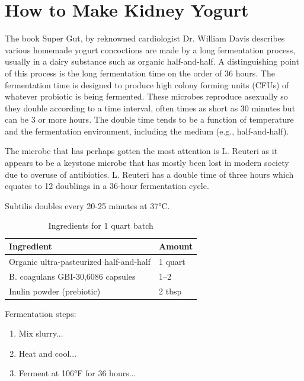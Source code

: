 \section{How to Make Kidney Yogurt}


The book Super Gut, by reknowned cardiologist Dr. William Davis describes various homemade yogurt concoctions are made by a long fermentation process, usually in a dairy substance such as organic half-and-half. A distinguishing point of this process is the long fermentation time on the order of 36 hours. The fermentation time is designed to produce high colony forming units (CFUs) of whatever probiotic is being fermented. These microbes reproduce asexually so they double according to a time interval, often times as short as 30 minutes but can be 3 or more hours. The double time tends to be a function of temperature and the fermentation environment, including the medium (e.g., half-and-half).

The microbe that has perhaps gotten the most attention is L. Reuteri as it appears to be a keystone microbe that has mostly been lost in modern society due to overuse of antibiotics. L. Reuteri has a double time of three hours which equates to 12 doublings in a 36-hour fermentation cycle.

Subtilis doubles every 20-25 minutes at 37°C. 

\begin{table}[ht]
	\centering
	\begin{tabular}{ll}
		\toprule
		\textbf{Ingredient} & \textbf{Amount} \\
		\midrule
		Organic ultra-pasteurized half-and-half & 1 quart \\
		B. coagulans GBI-30,6086 capsules & 1--2 \\
		Inulin powder (prebiotic) & 2 tbsp \\
		\bottomrule
	\end{tabular}
	\caption{Ingredients for 1 quart batch}
	\label{tab:recipe-ingredients}
\end{table}

Fermentation steps:
\begin{enumerate}[leftmargin=*]
	\item Mix slurry...
	\item Heat and cool...
	\item Ferment at 106°F for 36 hours...
\end{enumerate}